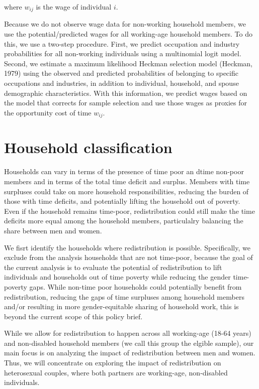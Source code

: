 \documentclass[
  11pt,
]{article}
\begin{document}
where \(w_{ij}\) is the wage of individual \(i\).

Because we do not observe wage data for non-working household members,
we use the potential/predicted wages for all working-age household
members. To do this, we use a two-step procedure. First, we predict
occupation and industry probabilities for all non-working individuals
using a multinomial logit model. Second, we estimate a maximum
likelihood Heckman selection model (Heckman, 1979) using the observed
and predicted probabilities of belonging to specific occupations and
industries, in addition to individual, household, and spouse demographic
characteristics. With this information, we predict wages based on the
model that corrects for sample selection and use those wages as proxies
for the opportunity cost of time \(w_{ij}\).

\section{Household classification}\label{household-classification}

Households can vary in terms of the presence of time poor an dtime
non-poor members and in terms of the total time deficit and surplus.
Members with time surpluses could take on more household
responsibilities, reducing the burden of those with time deficits, and
potentially lifting the household out of poverty. Even if the household
remains time-poor, redistribution could still make the time deficits
more equal among the household members, particulalry balancing the share
between men and women.

We fisrt identify the households where redistribution is possible.
Specifically, we exclude from the analysis households that are not
time-poor, because the goal of the current analysis is to evaluate the
potential of redistribution to lift individuals and households out of
time poverty while reducing the gender time-poverty gaps. While non-time
poor households could potentially benefit from redistribution, reducing
the gaps of time surpluses among household members and/or resulting in
more gender-equitable sharing of household work, this is beyond the
current scope of this policy brief.

While we allow for redistribution to happen across all working-age
(18-64 years) and non-disabled household members (we call this group the
elgible sample), our main focus is on analyzing the impact of
redistribution between men and women. Thus, we will concentrate on
exploring the impact of redistribution on heterosexual couples, where
both partners are working-age, non-disabled individuals.
\end{document}
